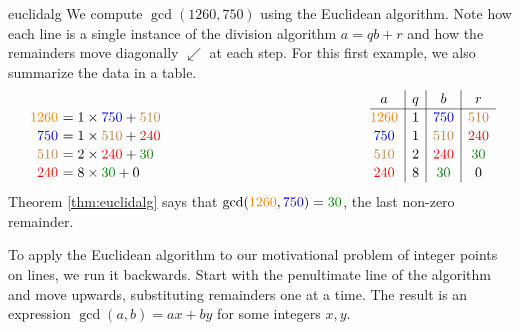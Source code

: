 \begin{example}{}{euclidalg}
	We compute $\gcd(1260,750)$ using the Euclidean algorithm. Note how each line is a single instance of the division algorithm $a=qb+r$ and how the remainders move diagonally $\swarrow$ at each step. For this first example, we also summarize the data in a table.\vspace{-10pt}
	\[
		\renewcommand{\arraystretch}{1.1}
		\begin{array}{r@{\,\,}l@{\hspace{150pt}}c|c|c|c}
			& & a & q & b & r \\\cline{3-6}
			\textcolor{orange}{1260} & =1\times\textcolor{blue}{750}+\textcolor{brown}{510} & \textcolor{orange}{1260}& 1 & \textcolor{blue}{750} & \textcolor{brown}{510}\\
			\textcolor{blue}{750} & =1\times\textcolor{brown}{510}+\textcolor{red}{240} & \textcolor{blue}{750}& 1 & \textcolor{brown}{510} & \textcolor{red}{240}\\
			\textcolor{brown}{510} & =2\times\textcolor{red}{240}+\textcolor{Green}{30} & \textcolor{brown}{510} & 2 & \textcolor{red}{240} & \textcolor{Green}{30}\\
			\textcolor{red}{240} & =8\times\textcolor{Green}{30}+0 & \textcolor{red}{240} & 8 & \textcolor{Green}{30} & 0
		\end{array}
	\]
	Theorem \ref{thm:euclidalg} says that $\gcd(\textcolor{orange}{1260},\textcolor{blue}{750})=\textcolor{Green}{30}$, the last non-zero remainder.
\end{example}

\goodbreak



To apply the Euclidean algorithm to our motivational problem of integer points on lines, we run it backwards. Start with the penultimate line of the algorithm and move upwards, substituting remainders one at a time. The result is an expression $\gcd(a,b)=ax+by$ for some integers $x,y$.


